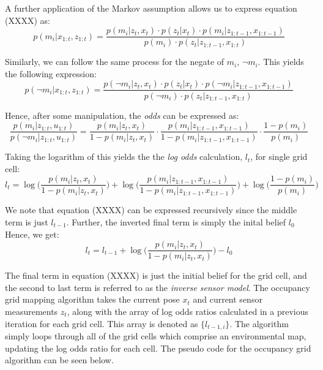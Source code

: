 \documentclass[a4paper]{article}
\begin{document}
A further application of the Markov assumption allows us to express equation (XXXX) as:
\begin{equation}
p(m_i | x_{1:t}, z_{1:t}) = \frac{p(m_i | z_t, x_t) \cdot p(z_t | x_t) \cdot p(m_i | z_{1:t-1}, x_{1:t-1})}{p(m_i) \cdot p(z_t | z_{1:t-1}, x_{1:t})}
\end{equation}

Similarly, we can follow the same process for the negate of $m_i$, $\neg m_i$. This yields the following expression:
\begin{equation}
p(\neg m_i | x_{1:t}, z_{1:t}) = \frac{p(\neg m_i | z_t, x_t) \cdot p(z_t | x_t) \cdot p(\neg m_i | z_{1:t-1}, x_{1:t-1})}{p( \neg m_i) \cdot p(z_t | z_{1:t-1}, x_{1:t})}
\end{equation}

Hence, after some manipulation, the \textit{odds} can be expressed as:
\begin{equation}
\frac{p(m_i | z_{1:t}, u_{1:t})}{p( \neg m_i | z_{1:t}, u_{1:t})} = \frac{p(m_i | z_t, x_t)}{1 - p(m_i | z_t, x_t)} \cdot \frac{p(m_i | z_{1:t-1}, x_{1:t-1})}{1 - p(m_i | z_{1:t-1}, x_{1:t-1})} \cdot \frac{1 - p(m_i)}{p(m_i)}
\end{equation}

Taking the logarithm of this yields the the \textit{log odds} calculation, $l_t$, for single grid cell:
\begin{equation}
l_t = \log \bigg( \frac{p(m_i | z_t, x_t)}{1 - p(m_i | z_t, x_t)} \bigg) + \log \bigg( \frac{p(m_i | z_{1:t-1}, x_{1:t-1})}{1 - p(m_i | z_{1:t-1}, x_{1:t-1})} \bigg) + \log \bigg( \frac{1 - p(m_i)}{p(m_i)} \bigg)
\end{equation}

We note that equation (XXXX) can be expressed recursively since the middle term is just $l_{t-1}$. Further, the inverted final term is simply the inital belief $l_0$ Hence, we get:
\begin{equation}
l_t = l_{t-1} + \log \bigg( \frac{p(m_i | z_t, x_t)}{1 - p(m_i | z_t, x_t)} \bigg) - l_0
\end{equation}

The final term in equation (XXXX) is just the initial belief for the grid cell, and the second to last term is referred to as the \textit{inverse sensor model}. The occupancy grid mapping algorithm takes the current pose $x_t$ and current sensor measurements $z_t$, along with the array of log odds ratios calculated in a previous iteration for each grid cell. This array is denoted as $\{l_{t-1,i}\}$. The algorithm simply loops through all of the grid cells which comprise an environmental map, updating the log odds ratio for each cell. The pseudo code for the occupancy grid algorithm can be seen below.
\end{document}
